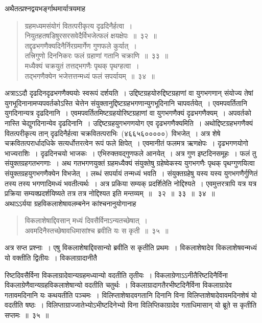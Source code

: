 \documentclass[11pt, openany]{book}
\begin{document}
\newpage
\thispagestyle{fancy}
\fancyhf{}
\indent
अथैतत्प्रश्नद्वयभर्ङ्गाथमार्यात्रयमाह\textendash
\begin{quote}
{\ks ग्रहमध्यमसंयोगं वितत्परीकृत्य दृढदिनैर्हत्वा~।\\
नियुतहतषडिषुरसरसवेदैर्विभजेत्फलं क्षयक्षेपः~॥~३२~॥\\
तद्दृढभगणैक्यदिनैर्निरग्रमार्गेण गुणफले कुर्यात्~।\\
तत्त्रिगुणो दिननिकरः फलं ग्रहाणां गतानि चक्राणि~॥~३३~॥\\
मध्यैक्यं चक्रयुतं तत्तद्भगणैः पृथक् पृथग्हत्वा~।\\
तद्भगणैक्येन भजेत्तत्तन्मध्यं फलं सपर्यायम्~॥~३४~॥}
\end{quote}
\indent
अत्राऽऽदौ दृढदिनदृढभगणैक्ययोः स्वरूपं दर्शयति~। उद्दिष्टग्रहयोरुद्दिष्टग्रहाणां वा युगभगणान् संयोज्य तेषां युगभूदिनानामप्यपवर्तकोऽस्ति चेत्तेन संयुक्तानुद्दिष्टग्रहभगणान्युगभूदिनानि चापवर्तयेत्~। एवमपवर्तितानि युगदिनान्यत्र
दृढदिनानि~। एवमपवर्तितमिष्टग्रहयोरिष्टग्रहाणां वा युगभगणैक्यं दृढभगणैक्यम्~। अपवर्तको नास्ति चेद्युगदिनान्येव दृढदिनानि~। उद्दिष्टग्रहयुगभगणयोग
एव दृढभगणैक्यमिति~। अथोद्दिष्टग्रहभगणैक्यं वितत्परीकृत्य तान् दृढदिनैर्हत्वा चक्रवितत्पराभिः~(४६६५६०००००)~विभजेत्~। अत्र शेषे चक्रवितत्परार्धादधिके सत्यर्धोत्तरत्वेन रूपं फले क्षिपेत्~। एवमानीतं फलमत्र ऋणक्षेपः~। दृढभगणयोगो भाज्यराशिः~। दृढदिनचयो भाजकः~। एभिरुक्तवद्गुणफले आनयेत्~। अत्र गुण इष्टदिनसमूहः~। फलं तु संयुक्तग्रहगतभगणाः~। अथ गतभगणयुक्तं ग्रहमध्यैक्यं संयुक्तेषु ग्रहेष्वेकस्य युगभगणैः पृथक् पृथग्गुणयित्वा संयुक्तग्रहयुगभगणैक्येन विभजेत्~। लब्धं सपर्यायं तन्मध्यं भवति~। संयुक्तग्रहेषु यस्य यस्य युगभगणैर्गुणितं तस्य तस्य
भगणादिमध्यं भवतीत्यर्थः~। अत्र प्रकिया सम्यक् प्रदर्शितेति नोद्दिश्यते~।
एवमुत्तरत्रापि यत्र यत्र प्रक्रिया सम्यक्प्रदर्शयिष्यते तत्र तत्र नोद्दिश्यत इति मन्तव्यम्~॥~
३२~॥~३३~॥~३४~॥\\
\indent
अथाऽऽर्यया ग्रहविकलाशेषावलम्बनेन कांश्चनानुयोगानाह\textendash
\begin{quote}
{\ks विकलाशेषाद्दिवसान् मध्यं दिवसैर्विनाऽन्यतच्छेषात्~।\\
अवमदिनैस्तच्छेषावधिमासांश्च ब्रवीति यः स कृती~॥~३५~॥}
\end{quote}

\indent
अत्र सप्त प्रश्नाः~। एषु विकलाशेषाद्दिवसान्यो ब्रवीति स कृतीति प्रथमः~।
विकलाशेषादेव विकलाशेषवन्मध्यं यो वक्तीति द्वितीयः~। विकलाग्रादानीतै\textendash

\newpage
\thispagestyle{fancy}
\fancyhf{}
\noindent
रिष्टदिवसैर्विना विकलाग्रादेवान्यग्रहमध्यान्यो वदतीति तृतीयः~। विकलाग्रेणाऽऽनीतैरिष्टदिनैर्विना विकलाग्रेणैवान्यग्रहविकलाशेषान्यो वदतीति चतुर्थः~।
विकलाग्रादागतैरभीष्टदिनैर्विना विकलाग्रादेव गतावमदिनानि यः कथयतीति
पञ्चमः~। विलिप्ताशेषादवगतानि दिनानि विना विलिप्ताशेषादेवावमदिनशेषं
यो वदतीति षष्ठः~। विलिप्ताग्राज्जातेभ्योऽभीष्टदिनेभ्यो विना विलिप्तिकाग्रादेव
गताधिमासान् यो ब्रूते स कृतीति सप्तमः~॥~३५~॥\\
\end{document}
